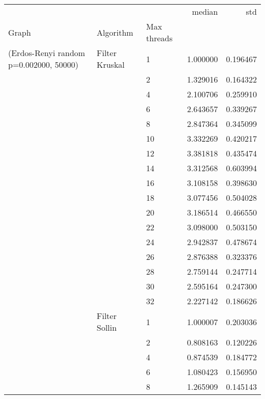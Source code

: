 \begin{tabular}{lllrr}
\toprule
                      &            &    &    median &       std \\
Graph & Algorithm & Max threads &           &           \\
\midrule
(Erdos-Renyi random p=0.002000, 50000) & Filter Kruskal & 1  &  1.000000 &  0.196467 \\
                      &            & 2  &  1.329016 &  0.164322 \\
                      &            & 4  &  2.100706 &  0.259910 \\
                      &            & 6  &  2.643657 &  0.339267 \\
                      &            & 8  &  2.847364 &  0.345099 \\
                      &            & 10 &  3.332269 &  0.420217 \\
                      &            & 12 &  3.381818 &  0.435474 \\
                      &            & 14 &  3.312568 &  0.603994 \\
                      &            & 16 &  3.108158 &  0.398630 \\
                      &            & 18 &  3.077456 &  0.504028 \\
                      &            & 20 &  3.186514 &  0.466550 \\
                      &            & 22 &  3.098000 &  0.503150 \\
                      &            & 24 &  2.942837 &  0.478674 \\
                      &            & 26 &  2.876388 &  0.323376 \\
                      &            & 28 &  2.759144 &  0.247714 \\
                      &            & 30 &  2.595164 &  0.247300 \\
                      &            & 32 &  2.227142 &  0.186626 \\
                      & Filter Sollin & 1  &  1.000007 &  0.203036 \\
                      &            & 2  &  0.808163 &  0.120226 \\
                      &            & 4  &  0.874539 &  0.184772 \\
                      &            & 6  &  1.080423 &  0.156950 \\
                      &            & 8  &  1.265909 &  0.145143 \\

\end{tabular}

